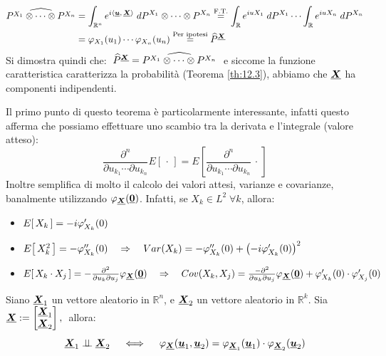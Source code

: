 \begin{teorema}
\begin{dimostrazione}
\begin{enumerate}
\begin{align*}
                \widehat{P^{X_1}\otimes\cdots \otimes P^{X_n}} & = \int_{\mathbb{R}^n} e^{i\left\langle \underline{{\boldsymbol{u}}},\, \underline{{\boldsymbol{X}}} \right\rangle}\; dP^{X_1}\otimes \cdots \otimes P^{X_n} \overset{\text{F.T.}}{=} \int_\mathbb{R}e^{iuX_1}\;dP^{X_1} \cdots \int_\mathbb{R}e^{iuX_n}\;dP^{X_n}\\
                & = \varphi_{X_1}(u_1)\cdots \varphi_{X_n}(u_n) \overset{\text{Per ipotesi}}{=} \widehat{P}^{\underline{{\boldsymbol{X}}}}
            \end{align*}
            Si dimostra quindi che: $\; \widehat{P}^{\underline{{\boldsymbol{X}}}} = \widehat{P^{X_1}\otimes\cdots \otimes P^{X_n}}\;$ e siccome la funzione caratteristica caratterizza la probabilità (Teorema \ref{th:12.3}), abbiamo che $\underline{{\boldsymbol{X}}}$ ha componenti indipendenti.
        \end{enumerate}
    \end{dimostrazione}
\end{teorema}

Il primo punto di questo teorema è particolarmente interessante, infatti questo afferma che possiamo effettuare uno scambio tra la derivata e l'integrale (valore atteso):
\[
\frac{\partial^n}{\partial u_{k_1} \cdots \partial u_{k_n}}
E\!\left[\,\cdot\,\right] = E\!\left[\frac{\partial^n}{\partial u_{k_1} \cdots\partial u_{k_n}}\,\cdot\,\right]\]
Inoltre semplifica di molto il calcolo dei valori attesi, varianze e covarianze, banalmente utilizzando $\varphi_{\underline{{\boldsymbol{X}}}}(\underline{{\boldsymbol{0}}})$. Infatti, se $X_k\in L^2\;\forall k$, allora:
\begin{itemize}
    \item $E\!\left[\,X_k\,\right] = -i\varphi'_{X_k}(0)$
    \item $E\!\left[\,X^2_k\,\right] = -\varphi''_{X_k}(0)\quad \Rightarrow\quad Var(X_k) = -\varphi''_{X_k}(0) + \bigl(-i\varphi'_{X_k}(0)\bigr)^2$
    \item $E\!\left[\,X_k\cdot X_j\,\right] = -\frac{\partial^2}{\partial u_k\partial u_j}\varphi_{\underline{{\boldsymbol{X}}}}(\underline{{\boldsymbol{0}}})\quad \Rightarrow\quad Cov(X_k, X_j) = \frac{-\partial^2}{\partial u_k\partial u_j}\varphi_{\underline{{\boldsymbol{X}}}}(\underline{{\boldsymbol{0}}}) + \varphi'_{X_k}(0)\cdot \varphi'_{X_j}(0)$
\end{itemize}
\begin{corollario}
    Siano $\underline{{\boldsymbol{X}}}_1$ un vettore aleatorio in $\mathbb{R}^n$, e $\underline{{\boldsymbol{X}}}_2$ un vettore aleatorio in $\mathbb{R}^k$. Sia $\underline{{\boldsymbol{X}}} := \begin{bmatrix}\underline{{\boldsymbol{X}}}_1\\\underline{{\boldsymbol{X}}}_2\end{bmatrix},\;$ allora:
    \[\underline{{\boldsymbol{X}}}_1 \mathrel{\perp\!\!\!\perp} \underline{{\boldsymbol{X}}}_2 \quad \iff \quad \varphi_{\underline{{\boldsymbol{X}}}}(\underline{{\boldsymbol{u}}}_1, \underline{{\boldsymbol{u}}}_2) = \varphi_{\underline{{\boldsymbol{X}}}_1}(\underline{{\boldsymbol{u}}}_1)\cdot \varphi_{\underline{{\boldsymbol{X}}}_2}(\underline{{\boldsymbol{u}}}_2)\]
\end{corollario}

